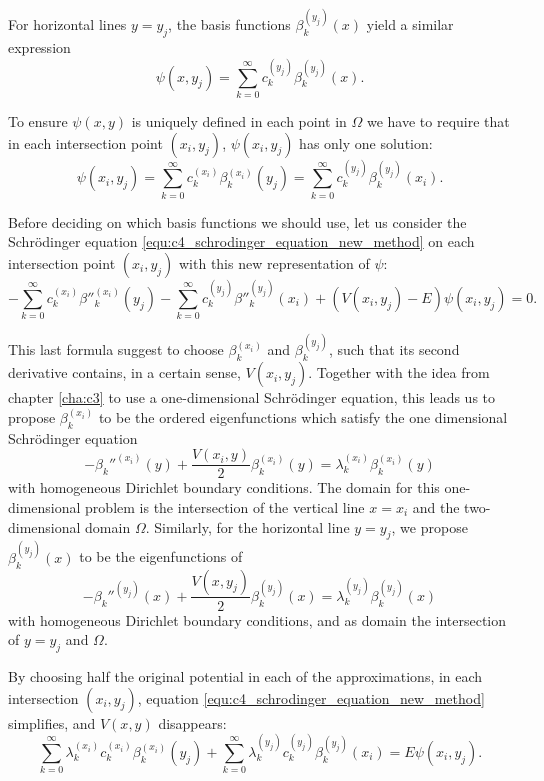 For horizontal lines $y = y_j$, the basis functions $\beta_k^{(y_j)}(x)$ yield a similar expression
\begin{equation}\label{equ:c4_expression_on_lines_y}
    \psi(x, y_j) = \sum_{k=0}^\infty c_k^{(y_j)} \beta_k^{(y_j)}(x) \text{.}
\end{equation}

To ensure $\psi(x, y)$ is uniquely defined in each point in $\Omega$ we have to require that in each intersection point $(x_i, y_j)$, $\psi(x_i, y_j)$ has only one solution:
\begin{equation}\label{equ:c4_new_method_pre_matrix_equality}
    \psi(x_i, y_j) = \sum_{k=0}^\infty c_k^{(x_i)} \beta_k^{(x_i)}(y_j) = \sum_{k=0}^\infty c_k^{(y_j)} \beta_k^{(y_j)}(x_i)\text{.}
\end{equation}

Before deciding on which basis functions we should use, let us consider the Schrödinger equation \eqref{equ:c4_schrodinger_equation_new_method} on each intersection point $(x_i, y_j)$ with this new representation of $\psi$:
$$
    -\sum_{k=0}^\infty c_k^{(x_i)} \beta''^{(x_i)}_k(y_j) - \sum_{k=0}^\infty c_k^{(y_j)} \beta''^{(y_j)}_k(x_i) + (V(x_i, y_j) - E) \psi(x_i, y_j) = 0\text{.}
$$

This last formula suggest to choose $\beta_k^{(x_i)}$ and $\beta_k^{(y_j)}$, such that its second derivative contains, in a certain sense, $V(x_i, y_j)$. Together with the idea from chapter \ref{cha:c3} to use a one-dimensional Schrödinger equation, this leads us to propose $\beta_k^{(x_i)}$ to be the ordered eigenfunctions which satisfy the one dimensional Schrödinger equation
$$
    -\beta_k''^{(x_i)}(y) + \frac{V(x_i, y)}{2}\beta_k^{(x_i)}(y) = \lambda_k^{(x_i)} \beta_k^{(x_i)}(y)
$$
with homogeneous Dirichlet boundary conditions. The domain for this one-dimensional problem is the intersection of the vertical line $x = x_i$ and the two-dimensional domain $\Omega$. Similarly, for the horizontal line $y = y_j$, we propose $\beta_k^{(y_j)}(x)$ to be the eigenfunctions of
$$
    -\beta_k''^{(y_j)}(x) + \frac{V(x, y_j)}{2}\beta_k^{(y_j)}(x) = \lambda_k^{(y_j)} \beta_k^{(y_j)}(x)
$$
with homogeneous Dirichlet boundary conditions, and as domain the intersection of $y = y_j$ and $\Omega$.

By choosing half the original potential in each of the approximations, in each intersection $(x_i, y_j)$, equation \eqref{equ:c4_schrodinger_equation_new_method} simplifies, and $V(x, y)$ disappears:
\begin{equation}\label{equ:c4_new_method_pre_matrix}
    \sum_{k=0}^\infty \lambda_k^{(x_i)} c_k^{(x_i)} \beta^{(x_i)}_k(y_j) + \sum_{k=0}^\infty \lambda_k^{(y_j)} c_k^{(y_j)} \beta_k^{(y_j)}(x_i) = E \psi(x_i, y_j) \text{.}
\end{equation}

